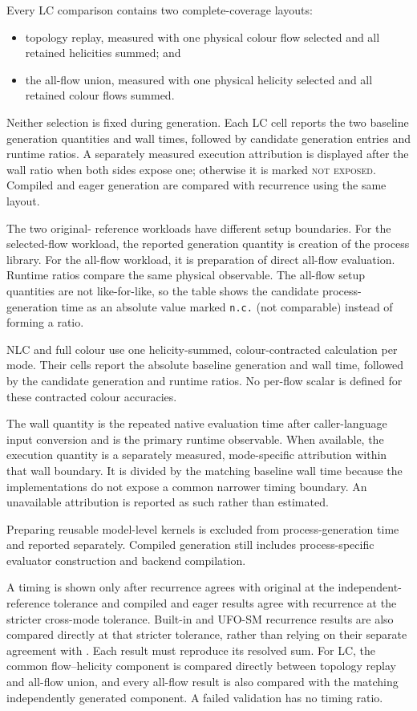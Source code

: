 Every LC comparison contains two complete-coverage layouts:
\begin{itemize}
  \item topology replay, measured with one physical colour flow selected and
        all retained helicities summed; and
  \item the all-flow union, measured with one physical helicity selected and
        all retained colour flows summed.
\end{itemize}
Neither selection is fixed during generation. Each LC cell reports the two
baseline generation quantities and wall times, followed by candidate
generation entries and runtime ratios. A separately measured execution
attribution is displayed after the wall ratio when both sides expose one;
otherwise it is marked \textsc{not exposed}. Compiled and eager generation are
compared with recurrence using the same layout.

The two original-\AC{} reference workloads have different setup boundaries.
For the selected-flow workload, the reported generation quantity is creation
of the process library. For the all-flow workload, it is preparation of direct
all-flow evaluation. Runtime ratios compare the same physical observable. The
all-flow setup quantities are not like-for-like, so the table shows the
candidate process-generation time as an absolute value marked \texttt{n.c.}
(not comparable) instead of forming a ratio.

NLC and full colour use one helicity-summed, colour-contracted calculation per
mode. Their cells report the absolute baseline generation and wall time,
followed by the candidate generation and runtime ratios. No per-flow scalar is
defined for these contracted colour accuracies.

The wall quantity is the repeated native evaluation time after caller-language
input conversion and is the primary runtime observable. When available, the
execution quantity is a separately measured, mode-specific attribution within
that wall boundary. It is divided by the matching baseline wall time because
the implementations do not expose a common narrower timing boundary. An
unavailable attribution is reported as such rather than estimated.

Preparing reusable model-level kernels is excluded from process-generation
time and reported separately.  Compiled generation still includes
process-specific evaluator construction and backend compilation.

A timing is shown only after recurrence agrees with original \AC{} at the
independent-reference tolerance and compiled and eager results agree with
recurrence at the stricter cross-mode tolerance. Built-in and UFO-SM recurrence
results are also compared directly at that stricter tolerance, rather than
relying on their separate agreement with \AC{}. Each result must reproduce its
resolved sum. For LC, the common flow--helicity component is compared directly
between topology replay and all-flow union, and every \PAC{} all-flow result is
also compared with the matching independently generated \AC{} component. A
failed validation has no timing ratio.


